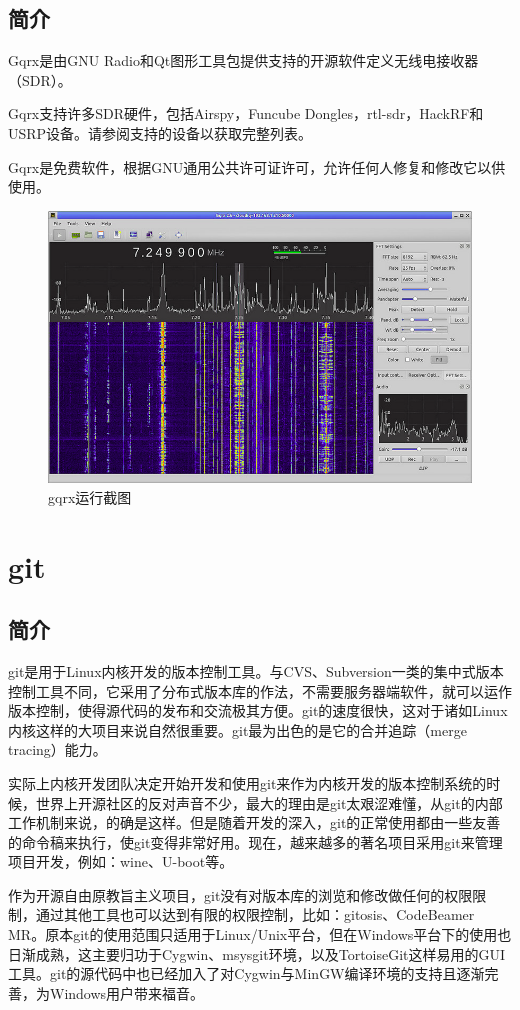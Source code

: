 	\subsection{简介}
	\par Gqrx是由GNU Radio和Qt图形工具包提供支持的开源软件定义无线电接收器（SDR）。
	\par Gqrx支持许多SDR硬件，包括Airspy，Funcube Dongles，rtl-sdr，HackRF和USRP设备。请参阅支持的设备以获取完整列表。
	\par Gqrx是免费软件，根据GNU通用公共许可证许可，允许任何人修复和修改它以供使用。
	\begin{figure}[htb]
		\centering
		\includegraphics[width=13cm]{figures/gqrx.png}
		\caption{gqrx运行截图}
		\label{fig:gqrx运行截图}
	\end{figure}
	
\section{git}
	\subsection{简介}
	\par git是用于Linux内核开发的版本控制工具。与CVS、Subversion一类的集中式版本控制工具不同，它采用了分布式版本库的作法，不需要服务器端软件，就可以运作版本控制，使得源代码的发布和交流极其方便。git的速度很快，这对于诸如Linux内核这样的大项目来说自然很重要。git最为出色的是它的合并追踪（merge tracing）能力。
	\par 实际上内核开发团队决定开始开发和使用git来作为内核开发的版本控制系统的时候，世界上开源社区的反对声音不少，最大的理由是git太艰涩难懂，从git的内部工作机制来说，的确是这样。但是随着开发的深入，git的正常使用都由一些友善的命令稿来执行，使git变得非常好用。现在，越来越多的著名项目采用git来管理项目开发，例如：wine、U-boot等。
	\par 作为开源自由原教旨主义项目，git没有对版本库的浏览和修改做任何的权限限制，通过其他工具也可以达到有限的权限控制，比如：gitosis、CodeBeamer MR。原本git的使用范围只适用于Linux/Unix平台，但在Windows平台下的使用也日渐成熟，这主要归功于Cygwin、msysgit环境，以及TortoiseGit这样易用的GUI工具。git的源代码中也已经加入了对Cygwin与MinGW编译环境的支持且逐渐完善，为Windows用户带来福音。\cite{ wiki:Git}
